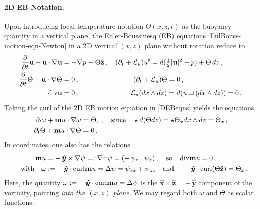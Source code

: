 \documentclass[11pt, oneside]{article}   	%
\def\contract{\makebox[1.2em][c]{\mbox{\rule{.6em}
{.01truein}\rule{.01truein}{.6em}}}}
\numberwithin{equation}{section}
\theoremstyle{plain}
\theoremstyle{definition}
\theoremstyle{remark}
\newcommand{\<}{\langle}
\renewcommand{\>}{\rangle}
\def\bm{{\bf m}}
\def\p{{\partial}}
\def\div{{\textrm{div}}}
\def\curl{{\textrm{curl}}}
\newcommand{\bs}[1]{\boldsymbol{#1}}
\begin{document}
\paragraph{2D EB Notation.}
Upon introducing local temperature notation $\Theta(x,z,t)$ as the buoyancy quantity in a vertical plane, the 
Euler-Boussinesq (EB) equations \eqref{EulBouss-motion-eqn-Newton} in a 2D vertical $(x,z)$ plane without rotation reduce to
\begin{align}
\begin{split}
\frac{\partial}{\partial t}\textbf{u} + \textbf{u}\cdot\nabla \textbf{u} &= -\nabla p +   \Theta\hat{\textbf{z}}
\,,\quad
(\p_t +  \mathcal{L}_u)u^\flat = d(\tfrac12|\textbf{u}|^2 - p) + \Theta\,dz
\,,\\
\frac{\partial}{\partial t} {\Theta} + \textbf{u}\cdot \nabla {\Theta} &= 0
\,,\hspace{27mm}
(\p_t +  \mathcal{L}_u) \Theta = 0
\,,\\
\div\mathbf{u} &= 0
\,,\hspace{25.66mm}
 \mathcal{L}_u (dx\wedge dz) = d(u\contract (dx\wedge dz)) = 0
\,.
\end{split}
\label{DEBeqns}
\end{align}
%
Taking the curl of the 2D EB motion equation in \eqref{DEBeqns} yields the equations,
%
\begin{align}
\begin{split}
\partial_t \omega + \bm{u}\cdot \nabla \omega
&= \Theta_x 
\,,
\quad \hbox{since}\quad \star d(\Theta dz) = \star \Theta_x dx\wedge dz = \Theta_x
\,,\\
\partial_t \Theta + \bm{u}\cdot \nabla \Theta &= 0
\,.\end{split}
\label{EB-eqns-def1}
\end{align}
In coordinates, one also has the relations
\begin{align}
\begin{split}
\bm{u} &= -\,\bs{\hat{y}}\times \nabla\psi =: \nabla^\perp\psi = (-\,\psi_z\,,\, \psi_x)\,,
\quad\hbox{so}\quad
{\div}\bm{u} = 0
\,,\\
\quad\hbox{with}\quad 
\omega &:= -\,\bs{\hat{y}}\cdot {\curl}\bm{u} = \Delta \psi  = \psi_{xx} + \psi_{zz}
\quad\hbox{and}\quad 
-\,\bs{\hat{y}}\cdot {\curl}(\Theta \hat{\textbf{z}}) = \Theta_x
\,.
\end{split}
\label{EB-eqns-def2}
\end{align}
%
Here, the quantity $\omega:=-\,\bs{\hat{y}}\cdot {\curl}\bm{u} = \Delta \psi$ is the $\bs{\hat{x}}\times\bs{\hat{z}}=-\,\bs{\hat{y}}$ component of the vorticity, pointing \emph{into the $(x,z)$ plane}. We may regard both $\omega$ and $\Theta$ as scalar functions. 
 
\end{document}
